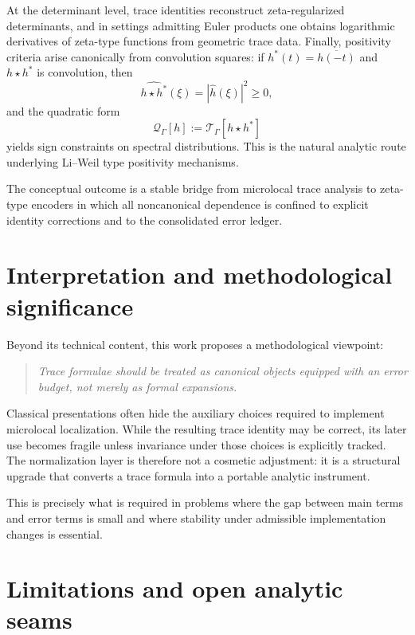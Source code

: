 At the determinant level, trace identities reconstruct zeta-regularized determinants, and in settings admitting Euler products one
obtains logarithmic derivatives of zeta-type functions from geometric trace data.  Finally, positivity criteria arise canonically
from convolution squares: if $h^\ast(t)=\overline{h(-t)}$ and $h\star h^\ast$ is convolution, then
\[
\widehat{h\star h^\ast}(\xi)=|\widehat h(\xi)|^2\ge0,
\]
and the quadratic form
\[
\mathcal Q_\Gamma[h]:=\mathcal T_\Gamma[h\star h^\ast]
\]
yields sign constraints on spectral distributions.  This is the natural analytic route underlying Li--Weil type positivity
mechanisms.

The conceptual outcome is a stable bridge from microlocal trace analysis to zeta-type encoders in which all noncanonical dependence
is confined to explicit identity corrections and to the consolidated error ledger.

\section{Interpretation and methodological significance}
\label{sec:11.methodology}

Beyond its technical content, this work proposes a methodological viewpoint:

\begin{quote}
\emph{Trace formulae should be treated as canonical objects equipped with an error budget, not merely as formal expansions.}
\end{quote}

Classical presentations often hide the auxiliary choices required to implement microlocal localization.  While the resulting trace
identity may be correct, its later use becomes fragile unless invariance under those choices is explicitly tracked.
The normalization layer is therefore not a cosmetic adjustment: it is a structural upgrade that converts a trace formula into a
portable analytic instrument.

This is precisely what is required in problems where the gap between main terms and error terms is small and where stability under
admissible implementation changes is essential.

\section{Limitations and open analytic seams}
\label{sec:11.open}

